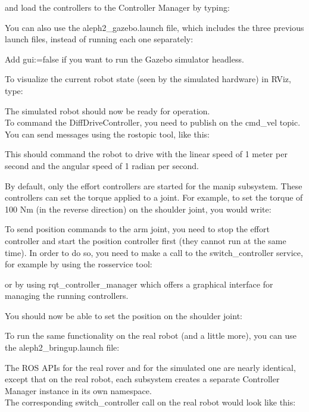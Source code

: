 \documentclass[english,inz,shortabstract]{iithesis}
\begin{document}
{and load the controllers to the Controller Manager by typing:


You can also use the \textsf{aleph2\_gazebo.launch} file, which includes the three previous launch files, instead of running each one separately:

Add \textsf{gui:=false} if you want to run the Gazebo simulator headless.

To visualize the current robot state (seen by the simulated hardware) in RViz, type:


The simulated robot should now be ready for operation.\\
To command the \textsf{DiffDriveController}, you need to publish on the \textsf{cmd\_vel} topic. You can send messages using the \textsf{rostopic} tool, like this:

This should command the robot to drive with the linear speed of 1 meter per second and the angular speed of 1 radian per second.

By default, only the effort controllers are started for the \textsf{manip} subsystem. These controllers can set the torque applied to a joint. For example, to set the torque of 100 Nm (in the reverse direction) on the \textsf{shoulder} joint, you would write:


To send position commands to the arm joint, you need to stop the effort controller and start the position controller first (they cannot run at the same time). In order to do so, you need to make a call to the \textsf{switch\_controller} service, for example by using the \textsf{rosservice} tool: 

or by using \textsf{rqt\_controller\_manager} which offers a graphical interface for managing the running controllers.

You should now be able to set the position on the \textsf{shoulder} joint:


To run the same functionality on the real robot (and a little more), you can use the \textsf{aleph2\_bringup.launch} file:


The ROS APIs for the real rover and for the simulated one are nearly identical, except that on the real robot, each subsystem creates a separate Controller Manager instance in its own namespace.\\
The corresponding \textsf{switch\_controller} call on the real robot would look like this:


} %
\end{document}
